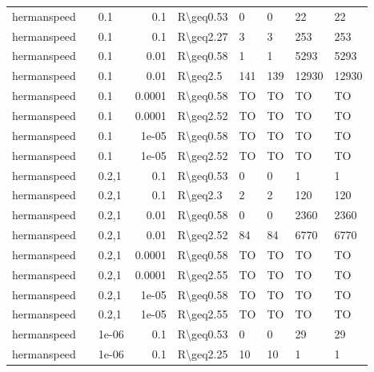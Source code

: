 \begin{longtable}{lllrlllll}
 hermanspeed   &           & 0.1   & 0.1    & R\textbackslash{}geq0.53  & 0    & 0    & 22       & 22      \\
 hermanspeed   &           & 0.1   & 0.1    & R\textbackslash{}geq2.27  & 3    & 3    & 253      & 253     \\
 hermanspeed   &           & 0.1   & 0.01   & R\textbackslash{}geq0.58  & 1    & 1    & 5293     & 5293    \\
 hermanspeed   &           & 0.1   & 0.01   & R\textbackslash{}geq2.5   & 141  & 139  & 12930    & 12930   \\
 hermanspeed   &           & 0.1   & 0.0001 & R\textbackslash{}geq0.58  & TO   & TO   & TO       & TO      \\
 hermanspeed   &           & 0.1   & 0.0001 & R\textbackslash{}geq2.52  & TO   & TO   & TO       & TO      \\
 hermanspeed   &           & 0.1   & 1e-05  & R\textbackslash{}geq0.58  & TO   & TO   & TO       & TO      \\
 hermanspeed   &           & 0.1   & 1e-05  & R\textbackslash{}geq2.52  & TO   & TO   & TO       & TO      \\
 hermanspeed   &           & 0.2,1 & 0.1    & R\textbackslash{}geq0.53  & 0    & 0    & 1        & 1       \\
 hermanspeed   &           & 0.2,1 & 0.1    & R\textbackslash{}geq2.3   & 2    & 2    & 120      & 120     \\
 hermanspeed   &           & 0.2,1 & 0.01   & R\textbackslash{}geq0.58  & 0    & 0    & 2360     & 2360    \\
 hermanspeed   &           & 0.2,1 & 0.01   & R\textbackslash{}geq2.52  & 84   & 84   & 6770     & 6770    \\
 hermanspeed   &           & 0.2,1 & 0.0001 & R\textbackslash{}geq0.58  & TO   & TO   & TO       & TO      \\
 hermanspeed   &           & 0.2,1 & 0.0001 & R\textbackslash{}geq2.55  & TO   & TO   & TO       & TO      \\
 hermanspeed   &           & 0.2,1 & 1e-05  & R\textbackslash{}geq0.58  & TO   & TO   & TO       & TO      \\
 hermanspeed   &           & 0.2,1 & 1e-05  & R\textbackslash{}geq2.55  & TO   & TO   & TO       & TO      \\
 hermanspeed   &           & 1e-06 & 0.1    & R\textbackslash{}geq0.53  & 0    & 0    & 29       & 29      \\
 hermanspeed   &           & 1e-06 & 0.1    & R\textbackslash{}geq2.25  & 10   & 10   & 1        & 1       \\

\end{longtable}
